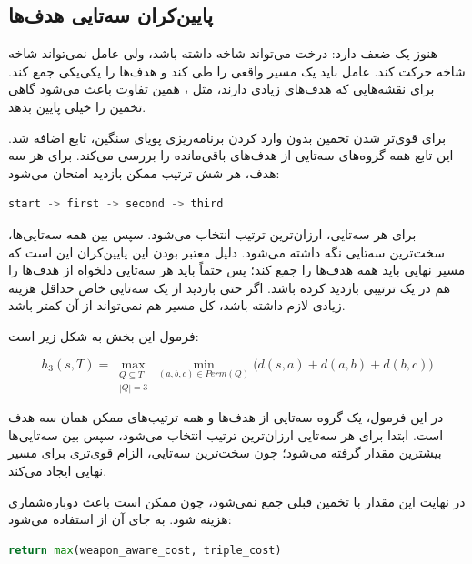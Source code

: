 \documentclass[10.5pt]{exam}
\begin{document}
\subsection{پایین‌کران سه‌تایی هدف‌ها}
هنوز یک ضعف دارد: درخت می‌تواند شاخه داشته باشد، ولی عامل نمی‌تواند شاخه شاخه حرکت کند. عامل باید یک مسیر واقعی را طی کند و هدف‌ها را یکی‌یکی جمع کند. برای نقشه‌هایی که هدف‌های زیادی دارند، مثل
، همین تفاوت باعث می‌شود
گاهی تخمین را خیلی پایین بدهد.

برای قوی‌تر شدن تخمین بدون وارد کردن برنامه‌ریزی پویای سنگین، تابع
اضافه شد. این تابع همه گروه‌های سه‌تایی از هدف‌های باقی‌مانده را بررسی می‌کند. برای هر سه هدف، هر شش ترتیب ممکن بازدید امتحان می‌شود:

\begin{latin}
\begin{lstlisting}[language=Python]
start -> first -> second -> third
\end{lstlisting}
\end{latin}

برای هر سه‌تایی، ارزان‌ترین ترتیب انتخاب می‌شود. سپس بین همه سه‌تایی‌ها، سخت‌ترین سه‌تایی نگه داشته می‌شود. دلیل معتبر بودن این پایین‌کران این است که مسیر نهایی باید همه هدف‌ها را جمع کند؛ پس حتماً باید هر سه‌تایی دلخواه از هدف‌ها را هم در یک ترتیبی بازدید کرده باشد. اگر حتی بازدید از یک سه‌تایی خاص حداقل هزینه زیادی لازم داشته باشد، کل مسیر هم نمی‌تواند از آن کمتر باشد.

فرمول این بخش به شکل زیر است:

\[
    h_3(s,T) =
    \max_{\substack{Q \subseteq T \\ |Q| = 3}}
    \min_{(a,b,c) \in Perm(Q)}
    \big(d(s,a) + d(a,b) + d(b,c)\big)
\]

در این فرمول،
یک گروه سه‌تایی از هدف‌ها و
همه ترتیب‌های ممکن همان سه هدف است. ابتدا برای هر سه‌تایی ارزان‌ترین ترتیب انتخاب می‌شود، سپس بین سه‌تایی‌ها بیشترین مقدار گرفته می‌شود؛ چون سخت‌ترین سه‌تایی، الزام قوی‌تری برای مسیر نهایی ایجاد می‌کند.

در نهایت این مقدار با تخمین قبلی جمع نمی‌شود، چون ممکن است باعث دوباره‌شماری هزینه شود. به جای آن از
استفاده می‌شود:

\begin{latin}
\begin{lstlisting}[language=Python]
return max(weapon_aware_cost, triple_cost)
\end{lstlisting}
\end{latin}
\end{document}
